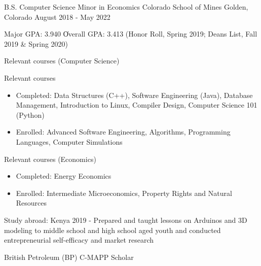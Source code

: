 \vspace{-2.0mm}


\begin{cventries}

  \cventry
    {B.S. Computer Science \newline \vspace{-1mm} Minor in Economics}
    {Colorado School of Mines} %
    {Golden, Colorado} %
    {August 2018 - May 2022} %
    {
      \begin{cvitems} %
        \item {Major GPA: 3.940 \| Overall GPA: 3.413 (Honor Roll, Spring 2019; Deans
    List, Fall 2019 \& Spring 2020)}
        \ifcv
        \item {Relevant courses (Computer Science)}
        \else
        \item {Relevant courses}
        \fi
        \begin {itemize}
               \item {Completed: Data Structures (C++), Software
    Engineering (Java), Database Management, Introduction to Linux, Compiler Design, Computer Science 101 (Python)}
        \item {Enrolled: Advanced Software Engineering, Algorithms, Programming Languages, Computer Simulations}
        \end {itemize}
        \ifcv
        \item {Relevant courses (Economics)}
        \begin{itemize}
          \item Completed: Energy Economics
          \item Enrolled: Intermediate Microeconomics, Property Rights and Natural Resources
        \end{itemize}
        \fi
\item {Study abroad: Kenya 2019 - Prepared and taught lessons on Arduinos and 3D modeling to
middle school and high school aged youth and conducted entrepreneurial self-efficacy and market research }
\item {British Petroleum (BP) C-MAPP Scholar}
      \end{cvitems}
    }



\end{cventries}
